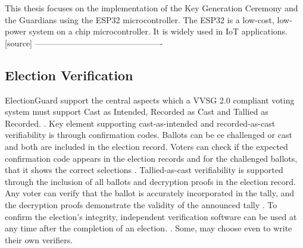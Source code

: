 This thesis focuses on the implementation of the Key Generation Ceremony and the Guardians using the ESP32 microcontroller. The ESP32 is a low-cost, low-power system on a chip microcontroller. It is widely used in IoT applications. [source]
----------------------------------------------
\subsection{Election Verification}
ElectionGuard support the central aspects which a VVSG 2.0 compliant voting system must support Cast as Intended, Recorded as Cast and Tallied as Recorded. \cite[17]{eg-paper}. Key element supporting cast-as-intended and recorded-as-cast verifiability is through confirmation codes. Ballots can be ce challenged or cast and both are included in the election record. Voters can check if the expected confirmation code appears in the election records and for the challenged ballots, that it shows the correct selections \cite[18]{eg-paper}. Tallied-as-cast verifiability is supported through the inclusion of all ballots and decryption proofs in the election record. Any voter can verify that the ballot is accurately incorporated in the tally, and the decryption proofs demonstrate the validity of the announced tally \cite[18]{eg-paper}. To confirm the election's integrity, independent verification software can be used at any time after the completion of an election. \cite[6]{eg-paper}. Some, may choose even to write their own verifiers.  